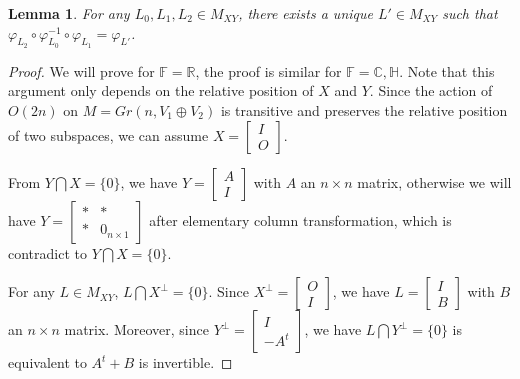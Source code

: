 \documentclass{article}
\newtheorem{lem}{Lemma}[section]
\begin{document}
\begin{lem}
For any $L_0, L_1, L_2 \in M_{XY}$, there exists a unique $L' \in M_{XY}$ such that
$\varphi_{L_2}\circ \varphi_{L_0}^{-1}\circ \varphi_{L_1}=\varphi_{L'}$.
\end{lem}
\begin{proof}
We will prove for $\mathbb{F}=\mathbb{R}$, the proof is similar for $\mathbb{F}=\mathbb{C},\mathbb{H}$. Note that this argument only depends on the
relative position of $X$ and $Y$. Since the action of $O(2n)$  on $M=Gr(n,V_1\oplus V_2)$
 is transitive and preserves the relative position of two subspaces, we can assume $X=\left[
\begin{array}{cc}
I \\
O \end{array} \right]$.

From $Y\bigcap X=\{0\}$, we have $Y=\left[
\begin{array}{cc}
A \\
I \end{array} \right]$ with $A$ an $n \times n$ matrix, otherwise we will have $Y=\left[
\begin{array}{cc}
* & *\\
* & 0_{n \times 1}\end{array} \right]$ after elementary column transformation, which is contradict to $Y\bigcap X=\{0\}$.

\bigskip

For any  $L \in M_{XY}$, $L \bigcap X^{\bot}=\{0\}$. Since $X^{\bot}=\left[
\begin{array}{cc}
O \\
I \end{array} \right]$, we have  $L=\left[
\begin{array}{cc}
I \\
B \end{array} \right]$ with $B$ an $n \times n$ matrix. Moreover,  since $Y^{\bot}=\left[
\begin{array}{cc}
I \\
-A^t \end{array} \right]$, we have $L \bigcap Y^{\bot}=\{0\}$ is equivalent to $A^t+B$ is invertible.

\bigskip


\end{proof}
\end{document}
